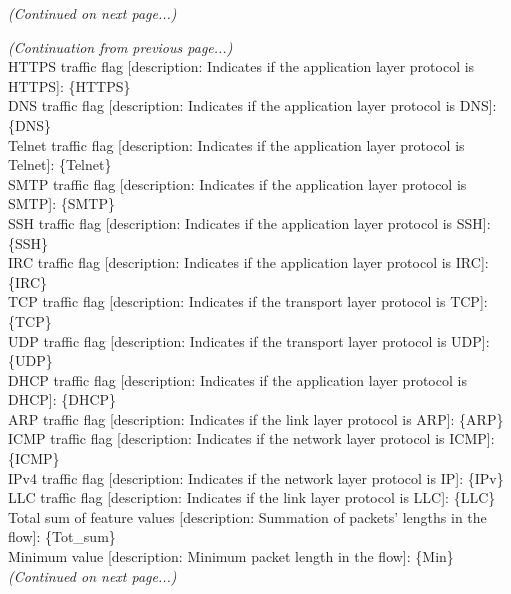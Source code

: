 \documentclass[11pt]{article}
\theoremstyle{plain}
\theoremstyle{definition}
\begin{document}
{\begin{tcolorbox}[userbox]
\textit{(Continued on next page...)}
\end{tcolorbox}
\begin{tcolorbox}[userbox]
\textit{(Continuation from previous page...)}\\
HTTPS traffic flag [description: Indicates if the application layer protocol is HTTPS]: \{HTTPS\} \\
DNS traffic flag [description: Indicates if the application layer protocol is DNS]: \{DNS\} \\
Telnet traffic flag [description: Indicates if the application layer protocol is Telnet]: \{Telnet\} \\
SMTP traffic flag [description: Indicates if the application layer protocol is SMTP]: \{SMTP\} \\
SSH traffic flag [description: Indicates if the application layer protocol is SSH]: \{SSH\} \\
IRC traffic flag [description: Indicates if the application layer protocol is IRC]: \{IRC\} \\
TCP traffic flag [description: Indicates if the transport layer protocol is TCP]: \{TCP\} \\
UDP traffic flag [description: Indicates if the transport layer protocol is UDP]: \{UDP\} \\
DHCP traffic flag [description: Indicates if the application layer protocol is DHCP]: \{DHCP\} \\
ARP traffic flag [description: Indicates if the link layer protocol is ARP]: \{ARP\} \\
ICMP traffic flag [description: Indicates if the network layer protocol is ICMP]: \{ICMP\} \\
IPv4 traffic flag [description: Indicates if the network layer protocol is IP]: \{IPv\} \\
LLC traffic flag [description: Indicates if the link layer protocol is LLC]: \{LLC\} \\
Total sum of feature values [description: Summation of packets' lengths in the flow]: \{Tot\_sum\} \\
Minimum value [description: Minimum packet length in the flow]: \{Min\} \\
\textit{(Continued on next page...)}
\end{tcolorbox}

}
\end{document}

